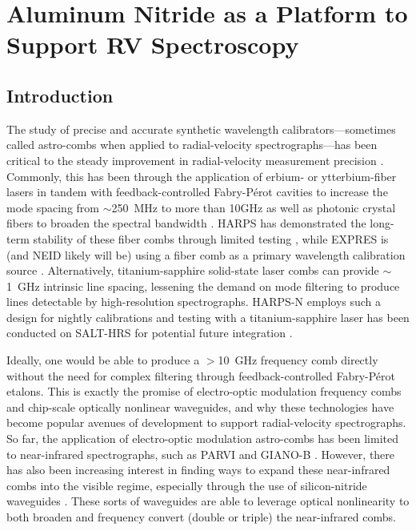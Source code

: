\chapter{Aluminum Nitride as a Platform to Support RV Spectroscopy} \label{chapter:astro-comb}

\section{Introduction} \label{astro-comb:intro}

The study of precise and accurate synthetic wavelength calibrators---sometimes called astro-combs when applied to radial-velocity spectrographs---has been critical to the steady improvement in radial-velocity measurement precision \citep{mccracken_decade_2017}. Commonly, this has been through the application of erbium- or ytterbium-fiber lasers in tandem with feedback-controlled Fabry-P\'erot cavities to increase the mode spacing from $\sim$250~\si{\mega\hertz} to more than 10\si{\giga\hertz} as well as photonic crystal fibers to broaden the spectral bandwidth \citep{probst_laser_2014}. HARPS has demonstrated the long-term stability of these fiber combs through limited testing \citep{probst_relative_2016}, while EXPRES is (and NEID likely will be) using a fiber comb as a primary wavelength calibration source \citep{blackman_performance_2020}. Alternatively, titanium-sapphire solid-state laser combs can provide $\sim$1~\si{\giga\hertz} intrinsic line spacing, lessening the demand on mode filtering to produce lines detectable by high-resolution spectrographs. HARPS-N employs such a design for nightly calibrations \citep{doerr_performance_2012} and testing with a titanium-sapphire laser has been conducted on SALT-HRS for potential future integration \citep{mccracken_wavelength_2017}.

Ideally, one would be able to produce a $>$10~\si{\giga\hertz} frequency comb directly without the need for complex filtering through feedback-controlled Fabry-P\'erot etalons. This is exactly the promise of electro-optic modulation frequency combs and chip-scale optically nonlinear waveguides, and why these technologies have become popular avenues of development to support radial-velocity spectrographs. So far, the application of electro-optic modulation astro-combs has been limited to near-infrared spectrographs, such as PARVI \citep{yi_demonstration_2016} and GIANO-B \citep{obrzud_broadband_2018}. However, there has also been increasing interest in finding ways to expand these near-infrared combs into the visible regime, especially through the use of silicon-nitride waveguides \citep{carlson_ultrafast_2017, obrzud_visible_2019}. These sorts of waveguides are able to leverage optical nonlinearity to both broaden and frequency convert (double or triple) the near-infrared combs.

